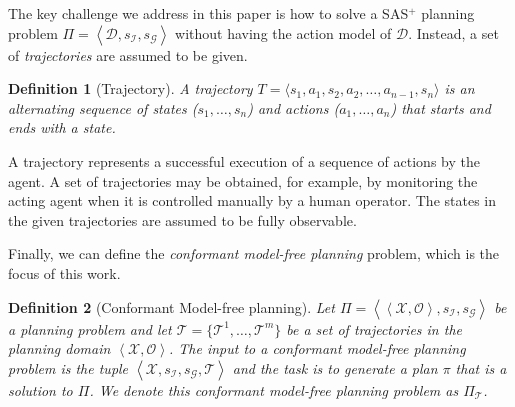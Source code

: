 \documentclass{article}
\newtheorem{definition}{Definition}
\newcommand{\tuple}[1]{\ensuremath{\left \langle #1 \right \rangle }}
\newcommand{\SAS}{SAS$^+$}
\newcommand{\roni}[1]{[[Roni:#1]]}
\begin{document}
	The key challenge we address in this paper is how to solve a \SAS{} 
	planning problem $\Pi=\tuple{\mathcal{D},s_\mathcal{I}, s_\mathcal{G}}$ without having the action model of $\mathcal{D}$. Instead, a set of {\em trajectories} are assumed to be given. 
	\begin{definition}[Trajectory]
		A trajectory $T=\langle s_1, a_1, s_2, a_2, \ldots, a_{n-1}, s_n\rangle$ is an alternating sequence of states ($s_1,\ldots,s_n$) and actions ($a_1,\ldots,a_n$) that starts and ends with a state. 
	\end{definition}
	A trajectory represents a successful execution of a sequence of actions by the agent. A set of trajectories may be obtained, for example, by monitoring the acting agent when it is controlled manually by a human operator. The states in the given trajectories are assumed to be fully observable. 
	
	Finally, we can define the {\em conformant model-free planning} problem, which is the focus of this work. 
	
	\begin{definition}[Conformant Model-free planning]
		Let $\Pi=\tuple{\tuple{\mathcal{X},\mathcal{O}},s_\mathcal{I}, s_\mathcal{G}}$ be a planning 
		problem and let $\mathcal{T}=\{\mathcal{T}^1,\ldots,\mathcal{T}^m\}$ be a set of trajectories in 
		the planning domain $\tuple{\mathcal{X},\mathcal{O}}$. 
		The input to a conformant model-free planning problem is 
		the tuple $\tuple{\mathcal{X},s_\mathcal{I}, s_\mathcal{G}, \mathcal{T}}$
		and the task is to generate a plan $\pi$  that is a solution to $\Pi$. We denote this conformant model-free planning problem as $\Pi_\mathcal{T}$. 
		\label{def:model-free-planning}
	\end{definition}
	
	
\end{document}
